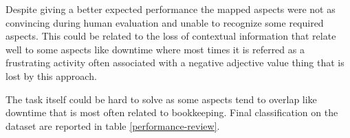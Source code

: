 Despite giving a better expected performance the mapped aspects were not
as convincing during human evaluation and unable to recognize some required aspects.
This could be related to the loss of contextual information that relate well to
some aspects like downtime where most times it is referred as a frustrating activity
often associated with a negative adjective value thing that is lost by this approach.

The task itself could be hard to solve as some aspects tend to overlap like downtime that is most often related to bookkeeping.
Final classification on the dataset are reported in table \ref{performance-review}.
